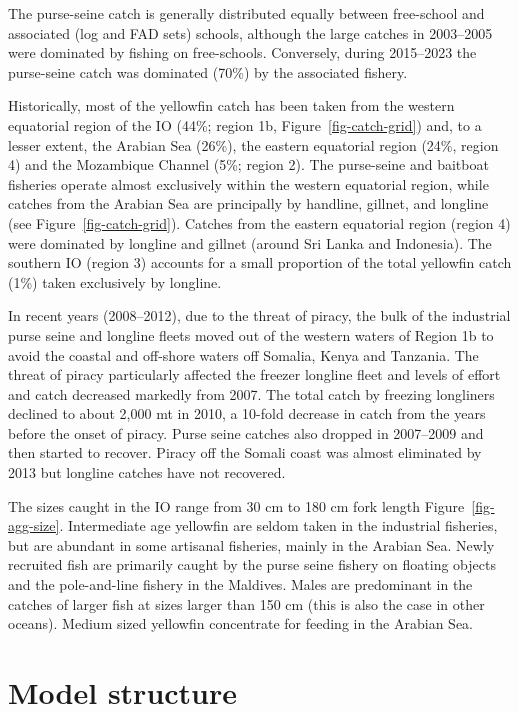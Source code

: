 \documentclass[
]{scrartcl}
\begin{document}
The purse-seine catch is generally distributed equally between
free-school and associated (log and FAD sets) schools, although the
large catches in 2003--2005 were dominated by fishing on free-schools.
Conversely, during 2015--2023 the purse-seine catch was dominated (70\%)
by the associated fishery.

Historically, most of the yellowfin catch has been taken from the
western equatorial region of the IO (44\%; region 1b,
Figure~\ref{fig-catch-grid}) and, to a lesser extent, the Arabian Sea
(26\%), the eastern equatorial region (24\%, region 4) and the
Mozambique Channel (5\%; region 2). The purse-seine and baitboat
fisheries operate almost exclusively within the western equatorial
region, while catches from the Arabian Sea are principally by handline,
gillnet, and longline (see Figure~\ref{fig-catch-grid}). Catches from
the eastern equatorial region (region 4) were dominated by longline and
gillnet (around Sri Lanka and Indonesia). The southern IO (region 3)
accounts for a small proportion of the total yellowfin catch (1\%) taken
exclusively by longline.

In recent years (2008--2012), due to the threat of piracy, the bulk of
the industrial purse seine and longline fleets moved out of the western
waters of Region 1b to avoid the coastal and off-shore waters off
Somalia, Kenya and Tanzania. The threat of piracy particularly affected
the freezer longline fleet and levels of effort and catch decreased
markedly from 2007. The total catch by freezing longliners declined to
about 2,000 mt in 2010, a 10-fold decrease in catch from the years
before the onset of piracy. Purse seine catches also dropped in
2007--2009 and then started to recover. Piracy off the Somali coast was
almost eliminated by 2013 but longline catches have not recovered.

The sizes caught in the IO range from 30 cm to 180 cm fork length
Figure~\ref{fig-agg-size}. Intermediate age yellowfin are seldom taken
in the industrial fisheries, but are abundant in some artisanal
fisheries, mainly in the Arabian Sea. Newly recruited fish are primarily
caught by the purse seine fishery on floating objects and the
pole-and-line fishery in the Maldives. Males are predominant in the
catches of larger fish at sizes larger than 150 cm (this is also the
case in other oceans). Medium sized yellowfin concentrate for feeding in
the Arabian Sea.

\section{Model structure}\label{model-structure}
\end{document}
